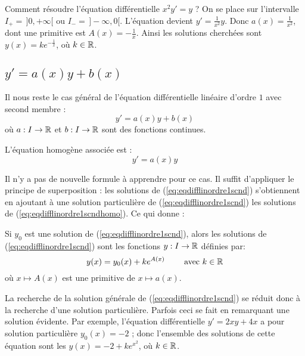 \documentclass[class=report,crop=false]{standalone}
\begin{document}
\begin{exemple}
Comment résoudre l'équation différentielle $x^2y'=y$ ?
On se place sur l'intervalle $I_+=\,]0,+\infty[$ ou $I_-=\,]-\infty,0[$.
L'équation devient $y'= \frac{1}{x^2}y$. Donc $a(x)=\frac{1}{x^2}$, dont une primitive est
$A(x)=-\frac1x$. Ainsi les solutions cherchées sont
$y(x) = k e^{-\frac1x}$, où $k\in\mathbb{R}$.
\end{exemple}


\subsection{$y' = a(x)y+b(x)$}

Il nous reste le cas général de l'équation différentielle linéaire d'ordre $1$ avec second membre :
\begin{equation}
   y' = a(x) y  + b(x)
  \label{eq:eqdifflinordre1scnd}
  \tag{$E$}
\end{equation}
où $a : I \to \mathbb{R}$ et $b: I \to \mathbb{R}$ sont des fonctions continues.

L'équation homogène associée est :
\begin{equation}
   y' = a(x) y
  \label{eq:eqdifflinordre1scndhomo}
  \tag{$E_0$}
\end{equation}

Il n'y a pas de nouvelle formule à apprendre pour ce cas.
Il suffit d'appliquer le principe de superposition : les solutions de (\ref{eq:eqdifflinordre1scnd}) s'obtiennent en
ajoutant à une solution particulière de (\ref{eq:eqdifflinordre1scnd}) les solutions de
(\ref{eq:eqdifflinordre1scndhomo}).
Ce qui donne :
\begin{proposition}
Si $y_0$ est une solution de (\ref{eq:eqdifflinordre1scnd}),
alors les solutions de (\ref{eq:eqdifflinordre1scnd}) sont les
fonctions $y : I \to \mathbb{R}$ définies par:
$$y(x)= y_0(x)+k e^{A(x)} \qquad \text{ avec } k \in \mathbb{R}$$
où $x\mapsto A(x)$ est une primitive de $x \mapsto a(x)$.
\end{proposition}


\bigskip
La recherche de la solution générale de (\ref{eq:eqdifflinordre1scnd}) se réduit
donc à la recherche d'une solution particulière. Parfois ceci
se fait en remarquant une solution évidente. Par exemple,
l'équation différentielle $y'=2xy+4x$
a pour solution particulière $y_0(x)=-2$ ;
donc l'ensemble des solutions de cette équation sont les
$y(x) = -2 + ke^{x^2}$, où $k\in\mathbb{R}$.

\bigskip
\bigskip
\end{document}
